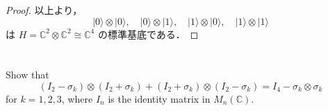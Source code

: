 \documentclass[dvipdfmx,a4paper]{jsarticle}
\theoremstyle{mystyle}
\begin{document}
\begin{proof}
\medskip
\noindent
以上より，
\[
|0\rangle\otimes|0\rangle,\quad
|0\rangle\otimes|1\rangle,\quad
|1\rangle\otimes|0\rangle,\quad
|1\rangle\otimes|1\rangle
\]
は $H=\mathbb{C}^2\otimes\mathbb{C}^2\cong\mathbb{C}^4$ の標準基底である．
\end{proof}

\newpage

\section*{}

Show that
\[
(I_2-\sigma_k)\otimes(I_2+\sigma_k)+(I_2+\sigma_k)\otimes(I_2-\sigma_k)=I_4-\sigma_k\otimes\sigma_k
\]
for $k=1,2,3$, where $I_n$ is the identity matrix in $M_n(\mathbb{C})$.

\vspace{1em}

\section*{}
\end{document}
